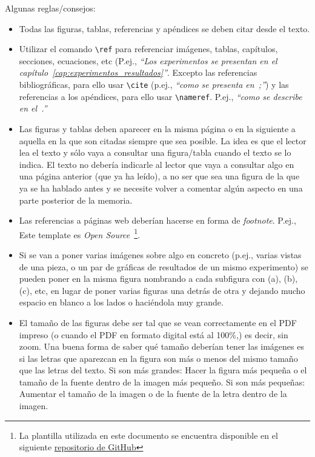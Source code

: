 \documentclass[a4paper,11pt,reqno,twoside]{memoir}
\begin{document}
Algunas reglas/consejos: 

\begin{itemize}
    \item Todas las figuras, tablas, referencias y apéndices se deben citar desde el texto.
    \item Utilizar el comando \lstinline{\ref} para referenciar imágenes, tablas, capítulos, secciones, ecuaciones, etc (P.ej., \textit{``Los experimentos se presentan en el capítulo~\ref{cap:experimentos_resultados}''}. Excepto las referencias bibliográficas, para ello usar \lstinline{\cite} (p.ej., \textit{``como se presenta en~\cite{k_project_uma};''}) y las referencias a los apéndices, para ello usar \lstinline{\nameref}. P.ej., \textit{``como se describe en el~.''}
    \item Las figuras y tablas deben aparecer en la misma página o en la siguiente a aquella en la que son citadas siempre que sea posible. La idea es que el lector lea el texto y sólo vaya a consultar una figura/tabla cuando el texto se lo indica. El texto no debería indicarle al lector que vaya a consultar algo en una página anterior (que ya ha leído), a no ser que sea una figura de la que ya se ha hablado antes y se necesite volver a comentar algún aspecto en una parte posterior de la memoria.
    \item Las referencias a páginas web deberían hacerse en forma de \textit{footnote}. P.ej., Este template es \textit{Open Source}~\footnote{La plantilla utilizada en este documento se encuentra disponible en el siguiente \href{https://github.com/jmgandarias/template_TFE}{repositorio de GitHub}}.
    \item Si se van a poner varias imágenes sobre algo en concreto (p.ej., varias vistas de una pieza, o un par de gráficas de resultados de un mismo experimento) se pueden poner en la misma figura nombrando a cada subfigura con (a), (b), (c), etc, en lugar de poner varias figuras una detrás de otra y dejando mucho espacio en blanco a los lados o haciéndola muy grande.
    \item El tamaño de las figuras debe ser tal que se vean correctamente en el PDF impreso (o cuando el PDF en formato digital está al 100\%,) es decir, sin zoom. Una buena forma de saber qué tamaño deberían tener las imágenes es si las letras que aparezcan en la figura son más o menos del mismo tamaño que las letras del texto. Si son más grandes: Hacer la figura más pequeña o el tamaño de la fuente dentro de la imagen más pequeño. Si son más pequeñas: Aumentar el tamaño de la imagen o de la fuente de la letra dentro de la imagen.

\end{itemize}
\end{document}
